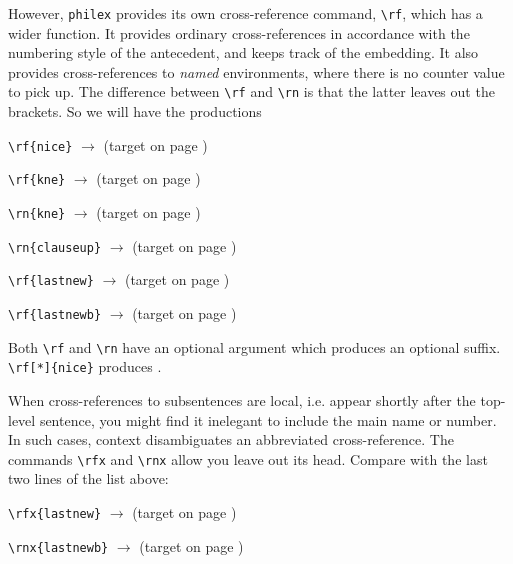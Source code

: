 \documentclass[10pt]{article}
\newcommand{\emp}{\emph}
\begin{document}
However, \verb+philex+ provides  its own cross-reference command, \verb+\rf+, which has a wider function. It provides ordinary cross-references in accordance with the numbering style of the antecedent, and keeps track of the embedding. It also provides cross-references to \emp{named} environments, where there is no counter value to pick up. The difference between \verb+\rf+ and \verb+\rn+ is that the latter leaves out the brackets. So we will have the productions 
\begin{trivlist}
\item \noindent \verb+\rf{nice}+ \(\longrightarrow\)  \hfill (target on page \pageref{nice})
\item \noindent \verb+\rf{kne}+ \(\longrightarrow\)  \hfill (target on page \pageref{kne})
\item \noindent \verb+\rn{kne}+ \(\longrightarrow\)  \hfill (target on page \pageref{kne})
\item \verb+\rn{clauseup}+ \(\longrightarrow\)   \hfill (target on page \pageref{clausesup})
\item \verb+\rf{lastnew}+ \(\longrightarrow\) \hfill (target on page \pageref{lastnew})
\item \verb+\rf{lastnewb}+ \(\longrightarrow\)  \hfill (target on page \pageref{lastnewb})
\end{trivlist}
	Both \verb+\rf+ and \verb+\rn+ have an optional argument which produces an optional suffix. \verb++ produces \rf[*]{nice}.
	
When cross-references to  subsentences are local, i.e. appear shortly after the top-level sentence,  you might find it inelegant to include the main name or number. In such cases, context disambiguates an abbreviated cross-reference. The commands \verb+\rfx+ and \verb+\rnx+ allow you leave out its head. Compare with the last two lines of the list above:

\begin{trivlist}
\item \verb+\rfx{lastnew}+ \(\longrightarrow\) \hfill (target on page \pageref{lastnew})
\item \verb+\rnx{lastnewb}+ \(\longrightarrow\)  \hfill (target on page \pageref{lastnewb})
\end{trivlist}
	
\end{document}
